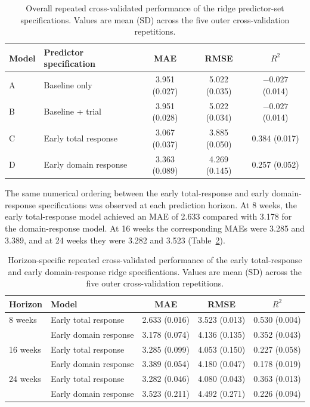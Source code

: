\documentclass[11pt]{article}
\begin{document}
\begin{table}[H]
\centering
\caption{Overall repeated cross-validated performance of the ridge
predictor-set specifications. Values are mean (SD) across the five
outer cross-validation repetitions.}
\label{tab:predictor-comparison}
\small
\begin{tabular}{llccc}
\toprule
Model & Predictor specification & MAE & RMSE & $R^2$ \\
\midrule
A & Baseline only
& 3.951 (0.027)
& 5.022 (0.035)
& $-0.027$ (0.014) \\

B & Baseline + trial
& 3.951 (0.028)
& 5.022 (0.034)
& $-0.027$ (0.014) \\

C & Early total response
& 3.067 (0.037)
& 3.885 (0.050)
& 0.384 (0.017) \\

D & Early domain response
& 3.363 (0.089)
& 4.269 (0.145)
& 0.257 (0.052) \\
\bottomrule
\end{tabular}
\end{table}

The same numerical ordering between the early total-response and
early domain-response specifications was observed at each prediction
horizon. At 8 weeks, the early total-response model achieved an MAE
of 2.633 compared with 3.178 for the domain-response model. At
16 weeks the corresponding MAEs were 3.285 and 3.389, and at
24 weeks they were 3.282 and 3.523
(Table~\ref{tab:total-v-domain}).

\begin{table}[H]
\centering
\caption{Horizon-specific repeated cross-validated performance of the
early total-response and early domain-response ridge specifications.
Values are mean (SD) across the five outer cross-validation repetitions.}
\label{tab:total-v-domain}
\small
\begin{tabular}{llccc}
\toprule
Horizon & Model & MAE & RMSE & $R^2$ \\
\midrule
8 weeks
& Early total response
& 2.633 (0.016)
& 3.523 (0.013)
& 0.530 (0.004) \\
& Early domain response
& 3.178 (0.074)
& 4.136 (0.135)
& 0.352 (0.043) \\
\midrule
16 weeks
& Early total response
& 3.285 (0.099)
& 4.053 (0.150)
& 0.227 (0.058) \\
& Early domain response
& 3.389 (0.054)
& 4.180 (0.047)
& 0.178 (0.019) \\
\midrule
24 weeks
& Early total response
& 3.282 (0.046)
& 4.080 (0.043)
& 0.363 (0.013) \\
& Early domain response
& 3.523 (0.211)
& 4.492 (0.271)
& 0.226 (0.094) \\
\bottomrule
\end{tabular}
\end{table}
\end{document}
